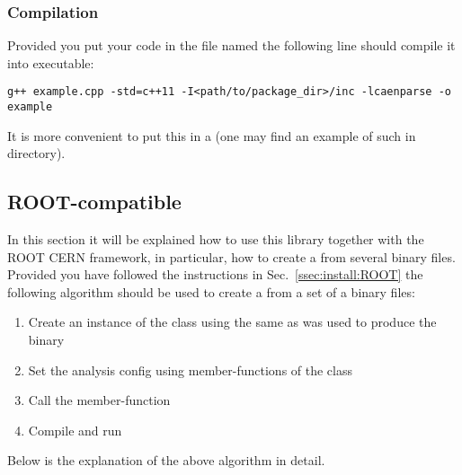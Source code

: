\subsubsection{Compilation}
Provided you put your code in the file named  the following line should compile
it into  executable:
\begin{lstlisting}
g++ example.cpp -std=c++11 -I<path/to/package_dir>/inc -lcaenparse -o example 
\end{lstlisting}
It is more convenient to put this in a  (one may find an example of such
 in  directory).

\subsection{ROOT-compatible}\label{ssec:ROOT}
In this section it will be explained how to use this library together with the ROOT CERN
framework, in particular, how to create a  from several binary files. Provided
you have followed the instructions in Sec.~\ref{ssec:install:ROOT} the following algorithm
should be used to create a  from a set of a binary files:
\begin{enumerate}
    \item Create an instance of the  class using the same 
        as was used to produce the binary
    \item Set the analysis config using member-functions of the  class
    \item Call the  member-function
    \item Compile and run
    \label{algo:tree}
\end{enumerate}
Below is the explanation of the above algorithm in detail. 

